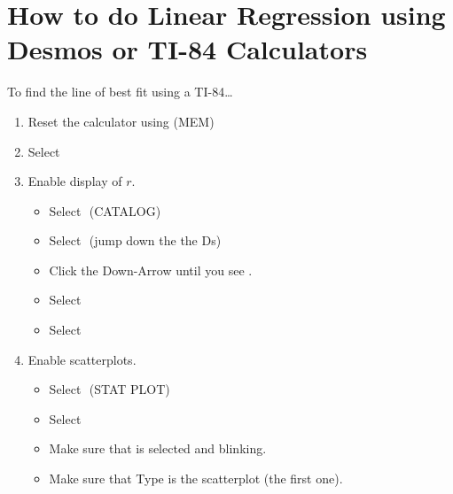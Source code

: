 \section*{How to do Linear Regression using Desmos or TI-84 Calculators}
\Large
%
\begin{center}
\begin{minipage}[t]{0.75\textwidth}
    \begin{myConcept}{To find the line of best fit using a {\scshape TI-84}\dots}
        \begin{enumerate}%
            \item Reset the calculator using 
                 \fbox{\ttfamily +} {\footnotesize\ttfamily (MEM)}
                  
            \item Select 
            \item Enable display of $r$.
                \begin{itemize}
                    \item Select 
                        \,\,{\footnotesize\ttfamily (CATALOG)}
                    \item Select 
                        \,\,{\footnotesize (jump down the the Ds)}
                    \item Click the Down-Arrow until you see .
                    \item Select 
                    \item Select 
                \end{itemize}
            \item Enable scatterplots.
                \begin{itemize}
                    \item Select 
                        \,\,{\footnotesize\ttfamily (STAT PLOT)}
                    \item Select 
                    \item Make sure that  is selected and blinking.
                    \item Make sure that {\ttfamily Type} is the scatterplot (the first one).

\end{itemize}
\end{enumerate}
\end{myConcept}
\end{minipage}
\end{center}
